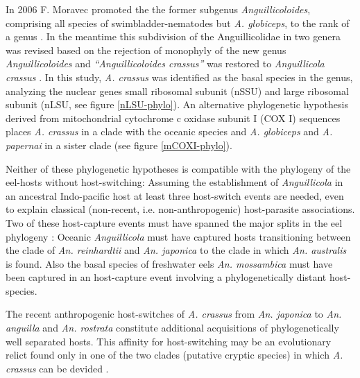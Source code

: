 In 2006 F. Moravec promoted the the former subgenus
\textit{Anguillicoloides}, comprising all species of
swimbladder-nematodes but \textit{A. globiceps}, to the rank of a
genus \cite{moravec_anguillicoloides}. In the meantime this
subdivision of the Anguillicolidae in two genera was revised based on
the rejection of monophyly of the new genus \textit{Anguillicoloides}
and \textit{``Anguillicoloides crassus''} was restored to
\textit{Anguillicola crassus} \cite{dl_py}. In this study,
\textit{A. crassus} was identified as the basal species in the genus,
analyzing the nuclear genes small ribosomal subunit (nSSU) and large
ribosomal subunit (nLSU, see figure \ref{nLSU-phylo}). An alternative
phylogenetic hypothesis derived from mitochondrial cytochrome c
oxidase subunit I (COX I) sequences places \textit{A. crassus} in a
clade with the oceanic species and \textit{A. globiceps} and
\textit{A. papernai} in a sister clade (see figure \ref{mCOXI-phylo}).

Neither of these phylogenetic hypotheses is compatible with the
phylogeny of the eel-hosts without host-switching: Assuming the
establishment of \textit{Anguillicola} in an ancestral Indo-pacific
host at least three host-switch events are needed, even to explain
classical (non-recent, i.e. non-anthropogenic) host-parasite
associations. Two of these host-capture events must have spanned the
major splits in the eel phylogeny \cite{minegishi_molecular_2005}:
Oceanic \textit{Anguillicola} must have captured hosts transitioning
between the clade of \textit{An. reinhardtii} and
\textit{An. japonica} to the clade in which \textit{An. australis} is
found. Also the basal species of freshwater eels
\textit{An. mossambica} must have been captured in an host-capture
event involving a phylogenetically distant host-species.


The recent anthropogenic host-switches of \textit{A. crassus} from
\textit{An. japonica} to \textit{An. anguilla} and
\textit{An. rostrata} constitute additional acquisitions of
phylogenetically well separated hosts. This affinity for
host-switching may be an evolutionary relict found only in one of the
two clades (putative cryptic species) in which \textit{A. crassus} can
be devided \cite{dl_py}.

